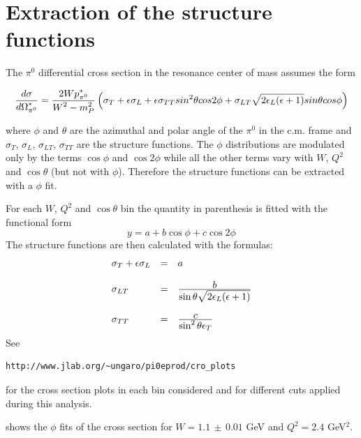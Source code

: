 \section{Extraction of the structure functions}
\label{sec:structure}
The $\pi^0$ differential cross section in the 
resonance center of mass assumes the form

\begin{equation}
\frac{\displaystyle d\sigma}{\displaystyle d\Omega^*_{\pi^0}} = \frac{\displaystyle 2W p^*_{\pi^0}}{\displaystyle W^2-m_P^2}\left( \sigma_T + \epsilon\sigma_L
+\epsilon\sigma_{TT}sin^2\theta cos2\phi +
\sigma_{LT}\sqrt{2\epsilon_L(\epsilon+1)}sin\theta cos\phi \right)
\end{equation}

where  $\phi$ and $\theta$ are the azimuthal and polar angle of the $\pi^0$ in the c.m. frame
and  $\sigma_T$, $\sigma_L$, $\sigma_{LT}$, $\sigma_{TT}$   are the structure functions.
The $\phi$ distributions are modulated only by the terms $\cos\phi$ and $\cos 2\phi$ while all the other
terms vary with $W$, $Q^2$ and $\cos\theta$ (but not with $\phi$).
Therefore the structure functions can be extracted with a $\phi$ fit.

For each $W$, $Q^2$ and $\cos\theta$ bin the 
quantity in parenthesis is fitted with the functional form
\begin{equation}
 y = a + b\cos\phi + c\cos 2\phi
\end{equation}
The structure functions are then calculated with the formulas:
\begin{equation}
\begin{array}{l l l}
\sigma_T + \epsilon\sigma_L & = & a \\
& & \\
\sigma_{LT}                 & = & \frac{\displaystyle b}{\displaystyle \sin\theta\sqrt{2\epsilon_L(\epsilon + 1)}} \\
& & \\
\sigma_{TT}                 & = & \frac{\displaystyle c}{\displaystyle \sin^2\theta \epsilon_T}
\end{array}
\end{equation}
See    \begin{verbatim} 
http://www.jlab.org/~ungaro/pi0eprod/cro_plots
\end{verbatim}
for the cross section plots in each bin considered and for different cuts applied
during this analysis.




 shows the $\phi$ fits of the cross section for $W=1.1\,\pm\,0.01$ GeV and $Q^2 = 2.4$ GeV$^2$.

